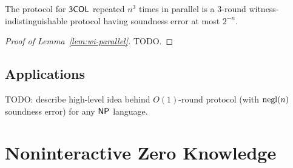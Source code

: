 \documentclass[11pt]{article}
\begin{document}
\begin{corollary}
  \label{cor:3col-parallel-wi}
  The protocol for $\mathsf{3COL}$ repeated $n^{3}$ times in parallel
  is a $3$-round witness-indistinguishable protocol having soundness
  error at most $2^{-n}$.
\end{corollary}

\begin{proof}[Proof of Lemma~\ref{lem:wi-parallel}]
  TODO.
\end{proof}

\subsection{Applications}
\label{sec:applications}

TODO: describe high-level idea behind $O(1)$-round protocol (with
$\operatorname{negl}(n)$ soundness error) for any $\mathsf{NP}$ language.

\section{Noninteractive Zero Knowledge}
\label{sec:nonint-zero-knowl}
\end{document}
